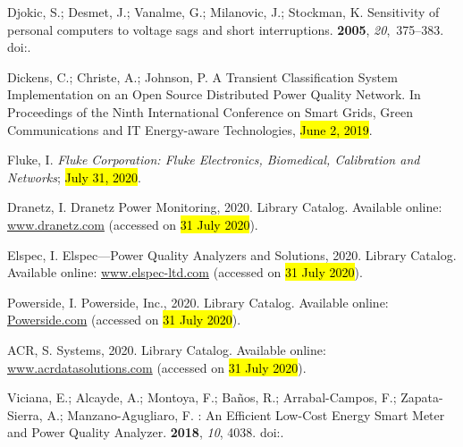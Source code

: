 \documentclass[energies,article,accept,moreauthors,pdftex]{Definitions/mdpi}
\begin{document}
\begin{thebibliography}{999}
Djokic, S.; Desmet, J.; Vanalme, G.; Milanovic, J.; Stockman, K.
\newblock Sensitivity of personal computers to voltage sags and short
interruptions.
 {\bf 2005}, {\em
20},~375--383.
\newblock
doi:{\href{https://doi.org/10.1109/TPWRD.2004.837828}{}}.

Dickens, C.; Christe, A.; Johnson, P.
\newblock A {Transient} {Classification} {System} {Implementation} on an {Open}
{Source} {Distributed} {Power} {Quality} {Network}.
\newblock  In Proceedings of the {Ninth} {International} {Conference} on {Smart}
{Grids}, {Green} {Communications} and {IT} {Energy}-aware {Technologies},
\hl{June 2, 2019}.

Fluke, I.
\newblock \emph{Fluke {Corporation}: {Fluke} {Electronics}, {Biomedical},
{Calibration} and {Networks}}; \hl{July 31, 2020}.

Dranetz, I.
\newblock Dranetz {Power} {Monitoring}, 2020.
\newblock Library Catalog. Available online:  \url{ www.dranetz.com} (accessed on \hl{31 July 2020}).

Elspec, I.
\newblock Elspec---{Power} Quality Analyzers and Solutions, 2020.
\newblock Library Catalog. Available online:  \url{www.elspec-ltd.com} (accessed on \hl{31 July 2020}).

Powerside, I.
\newblock Powerside, {Inc}., 2020.
\newblock Library Catalog. Available online:  \url{Powerside.com}  (accessed on \hl{31 July 2020}).

ACR, S.
 {Systems}, 2020.
\newblock Library Catalog. Available online:  \url{www.acrdatasolutions.com}  (accessed on \hl{31 July 2020}).

Viciana, E.; Alcayde, A.; Montoya, F.; Baños, R.; Arrabal-Campos, F.;
Zapata-Sierra, A.; Manzano-Agugliaro, F.
: {An} {Efficient} {Low}-{Cost} {Energy} {Smart} {Meter}
and {Power} {Quality} {Analyzer}.
 {\bf 2018}, {\em 10}, 4038.
\newblock
doi:{\href{https://doi.org/10.3390/su10114038}{}}.


\end{thebibliography}
\end{document}
